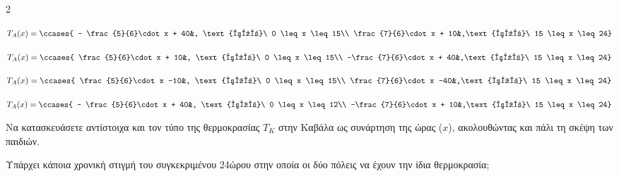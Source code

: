 \begin{alist}
\begin{multicols}{2}
\item
  $T_{A}(x)=\ccases{
   - \frac{5}{6}\cdot x + 40&, \text{για}\ 0 \leq x \leq 15\\
  \frac{7}{6}\cdot x + 10&,\text{για}\ 15 \leq x \leq 24}$
\item
  $T_{A}(x)=\ccases{
   \frac{5}{6}\cdot x + 10&, \text{για}\ 0 \leq x \leq 15\\
  -\frac{7}{6}\cdot x + 40&,\text{για}\ 15 \leq x \leq 24}$
\item
  $T_{A}(x)=\ccases{
   \frac{5}{6}\cdot x -10&, \text{για}\ 0 \leq x \leq 15\\
  \frac{7}{6}\cdot x -40&,\text{για}\ 15 \leq x \leq 24}$
\item
  $T_{A}(x)=\ccases{
   - \frac{5}{6}\cdot x + 40&, \text{για}\ 0 \leq x \leq 12\\
  -\frac{7}{6}\cdot x + 10&,\text{για}\ 15 \leq x \leq 24}$

\end{multicols}
\vspace{-5mm}
\begin{rlist}[start=3]
\item Nα κατασκευάσετε αντίστοιχα και τον τύπο της θερμοκρασίας $T_{K}$ στην Καβάλα ως συνάρτηση της ώρας ($x$), ακολουθώντας και πάλι τη σκέψη των παιδιών. 
\end{rlist}
\item Υπάρχει κάποια χρονική στιγμή του συγκεκριμένου 24ώρου στην οποία οι δύο πόλεις να έχουν την ίδια θερμοκρασία;
\end{alist}

